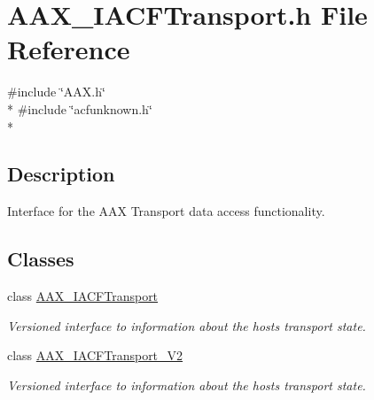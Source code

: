 \hypertarget{a00233}{}\section{A\+A\+X\+\_\+\+I\+A\+C\+F\+Transport.\+h File Reference}
\label{a00233}
{\ttfamily \#include \char`\"{}A\+A\+X.\+h\char`\"{}}\\*
{\ttfamily \#include \char`\"{}acfunknown.\+h\char`\"{}}\\*


\subsection{Description}
Interface for the A\+A\+X Transport data access functionality. 

\subsection*{Classes}
\begin{DoxyCompactItemize}
\item 
class \hyperlink{a00082}{A\+A\+X\+\_\+\+I\+A\+C\+F\+Transport}
\begin{DoxyCompactList}\small\item\em Versioned interface to information about the host\textquotesingle{}s transport state. \end{DoxyCompactList}\item 
class \hyperlink{a00083}{A\+A\+X\+\_\+\+I\+A\+C\+F\+Transport\+\_\+\+V2}
\begin{DoxyCompactList}\small\item\em Versioned interface to information about the host\textquotesingle{}s transport state. \end{DoxyCompactList}\end{DoxyCompactItemize}
